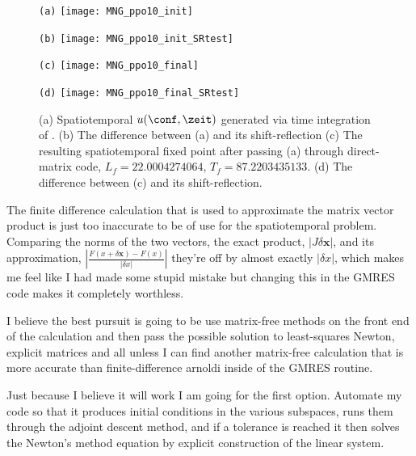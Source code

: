 \begin{itemize}
\begin{figure}
\begin{minipage}[height=.32\textheight]{.5\textwidth}
\centering \small{\texttt{(a)}}
\texttt{[image: MNG\_ppo10\_init]}
\end{minipage}
\begin{minipage}[height=.32\textheight]{.5\textwidth}
\centering \small{\texttt{(b)}}
\texttt{[image: MNG\_ppo10\_init\_SRtest]}
\end{minipage}
\begin{minipage}[height=.32\textheight]{.5\textwidth}
\centering \small{\texttt{(c)}}
\texttt{[image: MNG\_ppo10\_final]}
\end{minipage}
\begin{minipage}[height=.32\textheight]{.5\textwidth}
\centering \small{\texttt{(d)}}
\texttt{[image: MNG\_ppo10\_final\_SRtest]}
\end{minipage}
\caption{ \label{fig:MNGSRppo10fixed}
(a) Spatiotemporal $u(\conf,\zeit)$ generated via time integration of
.
(b) The difference between (a) and its shift-reflection
(c) The resulting spatiotemporal fixed point after passing (a) through direct-matrix code,
$L_f=22.0004274064$, $T_f=87.2203435133$.
(d) The difference between (c) and its shift-reflection.
}
\end{figure}

The finite difference calculation that is used to approximate the matrix
vector product is just too inaccurate to be of use for the spatiotemporal
problem. Comparing the norms of the two vectors, the exact product, $|J \delta \mathbf{x}|$,
and its approximation,
$|\frac{F(x+\delta \mathbf{x})-F(x)}{|\delta x|}|$ they're off by almost exactly $|\delta x|$,
which makes me feel like I had made some stupid mistake but changing this in the GMRES code
makes it completely worthless.

I believe the best pursuit is going to be use matrix-free methods on the front end of
the calculation and then pass the possible solution to least-squares Newton, explicit
matrices and all unless I can find another matrix-free calculation that is more accurate
than finite-difference arnoldi inside of the GMRES routine.

Just because I believe it will work I am going for the first option. Automate my
code so that it produces initial conditions in the various subspaces, runs them through
the adjoint descent method, and if a tolerance is reached it then solves the Newton's
method equation by explicit construction of the linear system.


\end{itemize}
